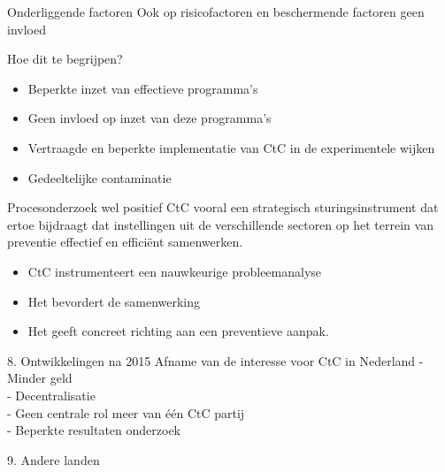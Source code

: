 \documentclass[
  ignorenonframetext,
]{beamer}
\providecommand{\tightlist}{%
  \setlength{\itemsep}{0pt}\setlength{\parskip}{0pt}}\usepackage{longtable,booktabs,array}
\begin{document}
\begin{frame}{Onderliggende factoren}
\protect\hypertarget{onderliggende-factoren}{}
Ook op risicofactoren en beschermende factoren geen invloed
\end{frame}

\begin{frame}{Hoe dit te begrijpen?}
\protect\hypertarget{hoe-dit-te-begrijpen}{}
\begin{itemize}
\tightlist
\item
  Beperkte inzet van effectieve programma's\\
\item
  Geen invloed op inzet van deze programma's
\item
  Vertraagde en beperkte implementatie van CtC in de experimentele
  wijken\\
\item
  Gedeeltelijke contaminatie
\end{itemize}
\end{frame}

\begin{frame}{Procesonderzoek wel positief}
\protect\hypertarget{procesonderzoek-wel-positief}{}
CtC vooral een strategisch sturingsinstrument dat ertoe bijdraagt dat
instellingen uit de verschillende sectoren op het terrein van preventie
effectief en efficiënt samenwerken.

\begin{itemize}
\tightlist
\item
  CtC instrumenteert een nauwkeurige probleemanalyse\\
\item
  Het bevordert de samenwerking\\
\item
  Het geeft concreet richting aan een preventieve aanpak.
\end{itemize}
\end{frame}

\begin{frame}{8. Ontwikkelingen na 2015}
\protect\hypertarget{ontwikkelingen-na-2015}{}
Afname van de interesse voor CtC in Nederland - Minder geld\\
- Decentralisatie\\
- Geen centrale rol meer van één CtC partij\\
- Beperkte resultaten onderzoek
\end{frame}

\begin{frame}{9. Andere landen}
\protect\hypertarget{andere-landen}{}
\end{frame}
\end{document}
